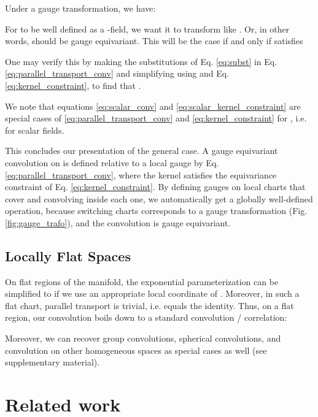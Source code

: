 \documentclass{article}
\begin{document}
Under a gauge transformation, we have:

For  to be well defined as a -field, we want it to transform like .
Or, in other words,  should be gauge equivariant.
This will be the case if and only if  satisfies

One may verify this by making the substitutions of Eq. \ref{eq:subst} in Eq. \ref{eq:parallel_transport_conv} and simplifying using  and Eq. \ref{eq:kernel_constraint}, to find that .

We note that equations \ref{eq:scalar_conv} and \ref{eq:scalar_kernel_constraint} are special cases of \ref{eq:parallel_transport_conv} and \ref{eq:kernel_constraint} for , i.e. for scalar fields.

This concludes our presentation of the general case.
A gauge equivariant  convolution on  is defined relative to a local gauge by Eq. \ref{eq:parallel_transport_conv}, where the kernel satisfies the equivariance constraint of Eq. \ref{eq:kernel_constraint}.
By defining gauges on local charts  that cover  and convolving inside each one, we automatically get a globally well-defined operation, because switching charts corresponds to a gauge transformation (Fig. \ref{fig:gauge_trafo}), and the convolution is gauge equivariant.


\subsection{Locally Flat Spaces}
\label{sec:locally_flat_spaces}

On flat regions of the manifold, the exponential parameterization can be simplified to  if we use an appropriate local coordinate  of .
Moreover, in such a flat chart, parallel transport is trivial, i.e.  equals the identity.
Thus, on a flat region, our convolution boils down to a standard convolution / correlation:

Moreover, we can recover group convolutions, spherical convolutions, and convolution on other homogeneous spaces as special cases as well (see supplementary material).


\section{Related work}
\label{sec:related_work}
\end{document}
